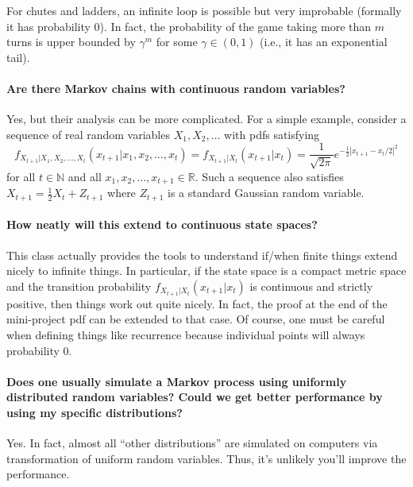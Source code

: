 \documentclass[10pt,english]{article}
\begin{document}
For chutes and ladders, an infinite loop is possible but very improbable (formally it has probability 0).
In fact, the probability of the game taking more than $m$ turns is upper bounded by $\gamma^m$ for some $\gamma \in (0,1)$ (i.e., it has an exponential tail).


\paragraph{Are there Markov chains with continuous random variables?}

Yes, but their analysis can be more complicated.
For a simple example, consider a sequence of real random variables $X_1,X_2,\ldots$ with pdfs satisfying
$$ f_{X_{t+1}|X_1,X_2,\ldots,X_{t}} (x_{t+1}|x_1,x_2,\ldots,x_{t}) = f_{X_{t+1}|X_{t}} (x_{t+1}|x_{t}) = \frac{1}{\sqrt{2\pi}} e^{-\frac{1}{2}|x_{t+1}-x_{t}/2|^2} $$
for all $t\in \mathbb{N}$ and all $x_1,x_2,\ldots,x_{t+1} \in \mathbb{R}$.
Such a sequence also satisfies $X_{t+1} = \frac{1}{2}X_{t} + Z_{t+1}$ where $Z_{t+1}$ is a standard Gaussian random variable.


\paragraph{How neatly will this extend to continuous state spaces?}

This class actually provides the tools to understand if/when finite things extend nicely to infinite things.
In particular, if the state space is a compact metric space and the transition probability $f_{X_{t+1} | X_t} (x_{t+1}|x_t)$ is continuous and strictly positive, then things work out quite nicely.
In fact, the proof at the end of the mini-project pdf can be extended to that case.
Of course, one must be careful when defining things like recurrence because individual points will always probability 0.


\paragraph{Does one usually simulate a Markov process using uniformly distributed random variables? Could we get better performance by using my specific distributions?}

Yes.
In fact, almost all ``other distributions'' are simulated on computers via transformation of uniform random variables.
Thus, it's unlikely you'll improve the performance.
\end{document}
